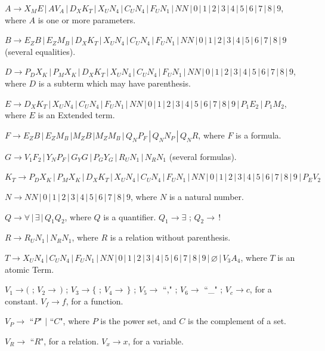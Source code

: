 \documentclass[11pt,a4paper]{article}
\begin{document}
		$A \rightarrow X_ME\,|\, AV_A\,|\,D_XK_T\,|\,X_UN_4 \,|\, C_UN_4 \,|\, F_UN_1\,|\,NN \,|\, 0\,|\,1\,|\,2\,|\,3\,|\,4\,|\,5\,|\,6\,|\,7\,|\,8\,|\,9$, where $A$ is one or more parameters.

		$B \rightarrow E_ZB\,|\,E_ZM_B\,|\,D_XK_T\,|\,X_UN_4 \,|\,C_UN_4 \,|\, F_UN_1\,|\,NN \,|\, 0\,|\,1\,|\,2\,|\,3\,|\,4\,|\,5\,|\,6\,|\,7\,|\,8\,|\,9$ (several equalities).

		$D \rightarrow P_DX_K\,|\,P_MX_K\,|\,D_XK_T\,|\,X_UN_4 \,|\, C_UN_4 \,|\, F_UN_1\,|\,NN \,|\, 0\,|\,1\,|\,2\,|\,3\,|\,4\,|\,5\,|\,6\,|\,7\,|\,8\,|\,9$, where $D$ is a subterm which may have parenthesis.

		$E \rightarrow D_XK_T\,|\,X_UN_4 \,|\, C_UN_4 \,|\, F_UN_1\,|\,NN \,|\, 0\,|\,1\,|\,2\,|\,3\,|\,4\,|\,5\,|\,6\,|\,7\,|\,8\,|\,9\,|\,P_1E_2\,|\,P_1M_2$, where $E$ is an Extended term.

		$F \rightarrow E_ZB\,|\,E_ZM_B\,|M_ZB\,|M_ZM_B\,|\, Q_N P_F\,|\, Q_N N_P\,|\, Q_N R$, where $F$ is a formula.

		$G \rightarrow V_1F_2\,|\,Y_N P_F\,|\, G_YG \,|\, P_GY_G\,|\,R_UN_1 \,|\, N_RN_1$ (several formulas).

		$K_T \rightarrow P_DX_K\,|\,P_MX_K\,|\,D_XK_T\,|\,X_UN_4 \,|\, C_UN_4 \,|\, F_UN_1\,|\,NN \,|\, 0\,|\,1\,|\,2\,|\,3\,|\,4\,|\,5\,|\,6\,|\,7\,|\,8\,|\,9\,|\,P_EV_2$

		$N \rightarrow NN \,|\, 0\,|\,1\,|\,2\,|\,3\,|\,4\,|\,5\,|\,6\,|\,7\,|\,8\,|\,9$, where $N$ is a natural number.

		$Q \rightarrow \forall\,|\,\exists\,|\,Q_1Q_2$, where $Q$ is a quantifier. $Q_1 \rightarrow \exists$ ; $Q_2 \rightarrow\,!$

		$R \rightarrow R_UN_1 \,|\, N_RN_1$, where $R$ is a relation without parenthesis.

		$T \rightarrow X_UN_4 \,|\, C_UN_4 \,|\, F_UN_1\,|\,NN \,|\, 0\,|\,1\,|\,2\,|\,3\,|\,4\,|\,5\,|\,6\,|\,7\,|\,8\,|\,9\,|\,\varnothing\,|\,V_3A_4$, where $T$ is an atomic Term.

		$V_1 \rightarrow ($ ; $V_2 \rightarrow\,)$ ; $V_3 \rightarrow \{$ ; $V_4 \rightarrow\,\}$ ; $V_5 \rightarrow$ ``," ; $V_6 \rightarrow$ ``\_" ; $V_c \rightarrow c$, for a constant.	$V_f \rightarrow f$, for a function.

		$V_P \rightarrow$ ``$P$" $|$ ``$C$", where $P$ is the power set, and $C$ is the complement of a set.

		$V_R \rightarrow$ ``$R$", for a relation. $V_x \rightarrow x$, for a variable.
\end{document}
